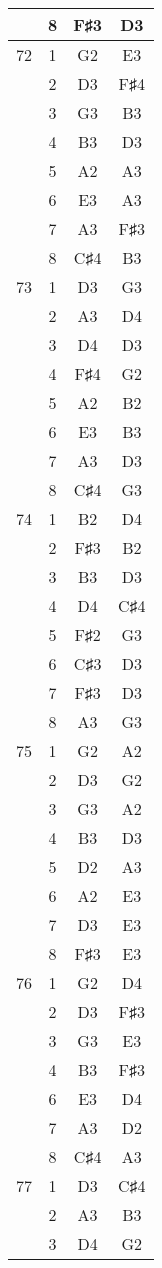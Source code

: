 \documentclass{article}
\begin{document}
\begin{longtable}{|c|c|c|c|}
  & 8 & F♯3 & D3 \\ 
\hline
72 & 1 & G2 & E3 \\ 
  & 2 & D3 & F♯4 \\ 
  & 3 & G3 & B3 \\ 
  & 4 & B3 & D3 \\ 
  & 5 & A2 & A3 \\ 
  & 6 & E3 & A3 \\ 
  & 7 & A3 & F♯3 \\ 
  & 8 & C♯4 & B3 \\ 
\hline
73 & 1 & D3 & G3 \\ 
  & 2 & A3 & D4 \\ 
  & 3 & D4 & D3 \\ 
  & 4 & F♯4 & G2 \\ 
  & 5 & A2 & B2 \\ 
  & 6 & E3 & B3 \\ 
  & 7 & A3 & D3 \\ 
  & 8 & C♯4 & G3 \\ 
\hline
74 & 1 & B2 & D4 \\ 
  & 2 & F♯3 & B2 \\ 
  & 3 & B3 & D3 \\ 
  & 4 & D4 & C♯4 \\ 
  & 5 & F♯2 & G3 \\ 
  & 6 & C♯3 & D3 \\ 
  & 7 & F♯3 & D3 \\ 
  & 8 & A3 & G3 \\ 
\hline
75 & 1 & G2 & A2 \\ 
  & 2 & D3 & G2 \\ 
  & 3 & G3 & A2 \\ 
  & 4 & B3 & D3 \\ 
  & 5 & D2 & A3 \\ 
  & 6 & A2 & E3 \\ 
  & 7 & D3 & E3 \\ 
  & 8 & F♯3 & E3 \\ 
\hline
76 & 1 & G2 & D4 \\ 
  & 2 & D3 & F♯3 \\ 
  & 3 & G3 & E3 \\ 
  & 4 & B3 & F♯3 \\ 
  & 6 & E3 & D4 \\ 
  & 7 & A3 & D2 \\ 
  & 8 & C♯4 & A3 \\ 
\hline
77 & 1 & D3 & C♯4 \\ 
  & 2 & A3 & B3 \\ 
  & 3 & D4 & G2 \\ 

\end{longtable}
\end{document}
